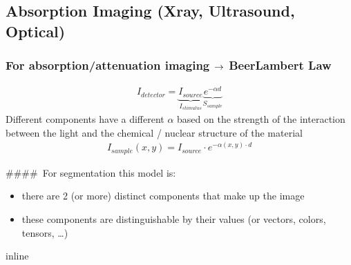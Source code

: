 \documentclass[letterpaper,10pt,english]{sphinxmanual}
\begin{document}
\noindent{}


\subsection{Absorption Imaging (X\sphinxhyphen{}ray, Ultrasound, Optical)}
\label{\detokenize{04-BasicSegmentation:absorption-imaging-x-ray-ultrasound-optical}}

\subsubsection{For absorption/attenuation imaging \protect\(\rightarrow\protect\) Beer\sphinxhyphen{}Lambert Law}
\label{\detokenize{04-BasicSegmentation:for-absorption-attenuation-imaging-rightarrow-beer-lambert-law}}\begin{equation*}
\begin{split}I_{detector}=\underbrace{I_{source}}_{I_{stimulus}}\underbrace{e^{-\alpha d}}_{S_{sample}}\end{split}
\end{equation*}
\sphinxAtStartPar
Different components have a different \(\alpha\) based on the strength of the interaction between the light and the chemical / nuclear structure of the material
\begin{equation*}
\begin{split}I_{sample}(x,y)=I_{source}\cdot{}e^{-\alpha(x,y)\cdot{}d}\end{split}
\end{equation*}


\sphinxAtStartPar
\#\#\#\# For segmentation this model is:
\begin{itemize}
\item {} 
\sphinxAtStartPar
there are 2 (or more) distinct components that make up the image

\item {} 
\sphinxAtStartPar
these components are distinguishable by their values (or vectors, colors, tensors, …)

\end{itemize}

\begin{sphinxVerbatim}[commandchars=\\\{\}]
 inline
   
   
   
\end{sphinxVerbatim}
\end{document}
